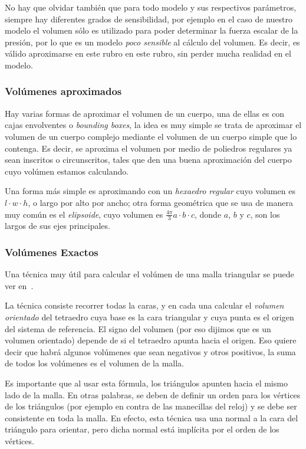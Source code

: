 No hay que olvidar también que para todo modelo y sus respectivos parámetros, siempre hay diferentes grados de sensibilidad, por ejemplo en el caso de nuestro modelo el volumen sólo es utilizado para poder determinar la fuerza escalar de la presión, por lo que es un modelo \emph{poco sensible} al cálculo del volumen.
Es decir, es válido aproximarse en este rubro en este rubro, sin perder mucha realidad en el modelo.

\subsubsection{Volúmenes aproximados}
Hay varias formas de aproximar el volumen de un cuerpo, una de ellas es con cajas envolventes o \emph{\textenglish{bounding boxes}}, la idea es muy simple se trata de aproximar el volumen de un cuerpo complejo mediante el volumen de un cuerpo simple que lo contenga.
Es decir, se aproxima el volumen por medio de poliedros regulares ya sean inscritos o circunscritos, tales que den una buena aproximación del cuerpo cuyo volúmen estamos calculando.

Una forma más simple es aproximando con un \emph{hexaedro regular} cuyo volumen es $ l \cdot w \cdot h $, o largo por alto por ancho; otra forma geométrica que se usa de manera muy común es el \emph{elipsoide}, cuyo volumen es $ \frac{4\pi}{3} a \cdot   b \cdot  c $, donde $a$, $b$ y $c$, son los largos de sus ejes principales.

\subsubsection{Volúmenes Exactos}
Una técnica muy útil para calcular el volúmen de una malla triangular se puede ver en~\cite{Zhang:volumen}.

La técnica consiste recorrer todas la caras, y en cada una calcular el \emph{volumen orientado} del tetraedro cuya base es la cara triangular y cuya punta es el origen del sistema de referencia.
El signo del volumen (por eso dijimos que es un volumen orientado) depende de si el tetraedro apunta hacia el origen.
Eso quiere decir que habrá algunos volúmenes que sean negativos y otros positivos, la suma de todos los volúmenes es el volumen de la malla.

Es importante que al usar esta fórmula, los triángulos apunten hacia el mismo lado de la malla.
En otras palabras, se deben de definir un orden para los vértices de los triángulos (por ejemplo en contra de las manecillas del reloj) y se debe ser consistente en toda la malla.
En efecto, esta técnica usa una normal a la cara del triángulo para orientar, pero dicha normal está implícita por el orden de los vértices.

